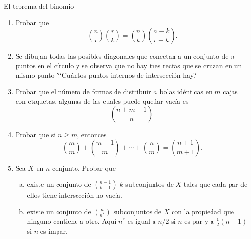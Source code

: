 \begin{section}{El teorema del binomio}
\begin{enumerate}[1)]
\item Probar que
$$
\binom{n}{r}\binom{r}{k}=\binom{n}{k}\binom{n-k}{r-k}.
$$

\item Se dibujan todas las posibles diagonales que conectan a un conjunto de $n$
puntos en el círculo y se observa que no hay tres rectas que se cruzan en un
mismo punto ?`Cuántos puntos internos de intersección hay?

\item Probar que el número de formas de distribuir $n$ bolas idénticas en $m$
cajas con etiquetas, algunas de las cuales puede quedar vacía es
$$
\binom{n+m-1}{n}.
$$

\item Probar que si $n \ge m$, entonces
$$
\binom{m}{m}+\binom{m+1}{m}+\cdots+\binom{n}{m}=\binom{n+1}{m+1}.
$$

\item  Sea $X$ un $n$-conjunto. Probar que

\begin{enumerate}[a)]
	\item existe un conjunto de $\binom{n-1}{k-1}$ $k$-subconjuntos de
$X$ tales que cada par de ellos tiene intersección no vacía.

	\item existe un conjunto de $\binom{n}{n^*}$ subconjuntos de $X$ 
con la propiedad que ninguno contiene a otro. Aquí $n^*$ es igual
a $n/2$ si $n$ es par y a $\frac12(n-1)$ si $n$ es impar.
\end{enumerate}
\end{enumerate}

\end{section}
